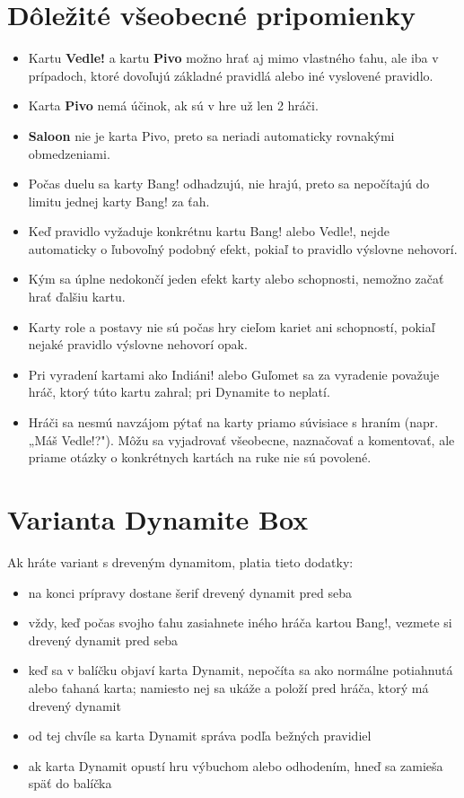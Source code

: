 \section*{Dôležité všeobecné pripomienky}
\begin{itemize}
    \item Kartu \textbf{Vedle!} a kartu \textbf{Pivo} možno hrať aj mimo vlastného ťahu, ale iba v prípadoch, ktoré dovoľujú základné pravidlá alebo iné vyslovené pravidlo.
    \item Karta \textbf{Pivo} nemá účinok, ak sú v hre už len 2 hráči.
    \item \textbf{Saloon} nie je karta Pivo, preto sa neriadi automaticky rovnakými obmedzeniami.
    \item Počas duelu sa karty Bang! odhadzujú, nie hrajú, preto sa nepočítajú do limitu jednej karty Bang! za ťah.
    \item Keď pravidlo vyžaduje konkrétnu kartu Bang! alebo Vedle!, nejde automaticky o ľubovoľný podobný efekt, pokiaľ to pravidlo výslovne nehovorí.
    \item Kým sa úplne nedokončí jeden efekt karty alebo schopnosti, nemožno začať hrať ďalšiu kartu.
    \item Karty role a postavy nie sú počas hry cieľom kariet ani schopností, pokiaľ nejaké pravidlo výslovne nehovorí opak.
    \item Pri vyradení kartami ako Indiáni! alebo Guľomet sa za vyradenie považuje hráč, ktorý túto kartu zahral; pri Dynamite to neplatí.
    \item Hráči sa nesmú navzájom pýtať na karty priamo súvisiace s hraním (napr. „Máš Vedle!?"). Môžu sa vyjadrovať všeobecne, naznačovať a komentovať, ale priame otázky o konkrétnych kartách na ruke nie sú povolené.
\end{itemize}

\section*{Varianta Dynamite Box}
Ak hráte variant s dreveným dynamitom, platia tieto dodatky:
\begin{itemize}
    \item na konci prípravy dostane šerif drevený dynamit pred seba
    \item vždy, keď počas svojho ťahu zasiahnete iného hráča kartou Bang!, vezmete si drevený dynamit pred seba
    \item keď sa v balíčku objaví karta Dynamit, nepočíta sa ako normálne potiahnutá alebo ťahaná karta; namiesto nej sa ukáže a položí pred hráča, ktorý má drevený dynamit
    \item od tej chvíle sa karta Dynamit správa podľa bežných pravidiel
    \item ak karta Dynamit opustí hru výbuchom alebo odhodením, hneď sa zamieša späť do balíčka
\end{itemize}
